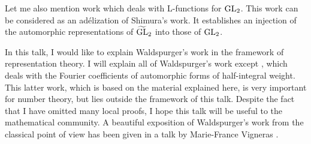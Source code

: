 Let me also mention work \cite{gps81shimura,gps83metaplectic} which deals with L-functions for $\mathrm{GL}_2$.
This work can be considered as an ad\'elization of Shimura's
work.
It establishes an injection of the automorphic representations of $\widetilde{\mathrm{GL}}_2$ into those of $\mathrm{GL}_2$.

In this talk, I would like to explain Waldspurger's work in the framework of representation theory.
I will explain all of Waldspurger's work except \cite{waldspurger81demientier}, which deals with the Fourier coefficients of automorphic forms of half-integral weight.
This latter work, which is based on the material explained here, is very important for number theory, but lies outside the framework of this talk.
Despite the fact that I have omitted many local proofs, I hope this talk will be useful to the mathematical community. 
A beautiful exposition of Waldspurger's work from the classical point of view has been given in a talk by Marie-France Vigneras \cite{vigneras79center}.